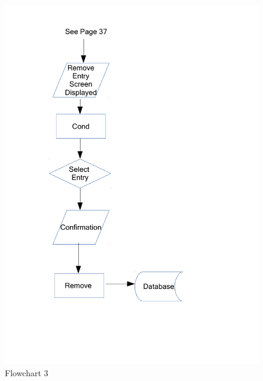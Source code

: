 \begin{figure}[H]
    \caption{Flowchart 3} \label{Flowchart_3.pdf}
    \includegraphics[width=\textwidth]{./Design/Flowcharts/Flowchart_3.pdf}
\end{figure}

